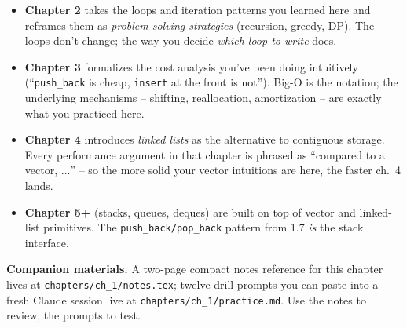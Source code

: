 \documentclass[11pt]{article}
\begin{document}
\begin{notebox}
\begin{itemize}
    \item \textbf{Chapter 2} takes the loops and iteration patterns you
    learned here and reframes them as \emph{problem-solving strategies}
    (recursion, greedy, DP). The loops don't change; the way you decide
    \emph{which loop to write} does.
    \item \textbf{Chapter 3} formalizes the cost analysis you've been doing
    intuitively (``\texttt{push\_back} is cheap, \texttt{insert} at the front
    is not''). Big-O is the notation; the underlying mechanisms -- shifting,
    reallocation, amortization -- are exactly what you practiced here.
    \item \textbf{Chapter 4} introduces \emph{linked lists} as the alternative
    to contiguous storage. Every performance argument in that chapter is
    phrased as ``compared to a vector, $\ldots$'' -- so the more solid your
    vector intuitions are here, the faster ch.~4 lands.
    \item \textbf{Chapter 5+} (stacks, queues, deques) are built on top of
    vector and linked-list primitives. The \texttt{push\_back/pop\_back}
    pattern from 1.7 \emph{is} the stack interface.
\end{itemize}
\end{notebox}

\textbf{Companion materials.} A two-page compact notes reference for this
chapter lives at \texttt{chapters/ch\_1/notes.tex}; twelve drill prompts you
can paste into a fresh Claude session live at
\texttt{chapters/ch\_1/practice.md}. Use the notes to review, the prompts to
test.
\end{document}
